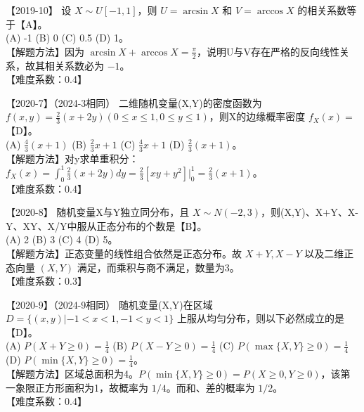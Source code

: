 \documentclass[zihao=4, a4paper, fontset=mac]{ctexart}
\begin{document}
\par\vspace{\baselineskip}

【2019-10】 设 $X\sim U[-1,1]$，则 $U=\arcsin X$ 和 $V=\arccos X$ 的相关系数等于【A】。\\
(A) -1 \quad (B) 0 \quad (C) 0.5 \quad (D) 1。\\
【解题方法】因为 $\arcsin X + \arccos X = \frac{\pi}{2}$，说明U与V存在严格的反向线性关系，故其相关系数必为 $-1$。\\
【难度系数：0.4】

\par\vspace{\baselineskip}

【2020-7】（2024-3相同） 二维随机变量(X,Y)的密度函数为 $f(x,y)=\frac{2}{3}(x+2y) (0\le x\le1,0\le y\le1)$，则X的边缘概率密度 $f_X(x)=$ 【D】。\\
(A) $\frac{4}{3}(x+1)$ \quad (B) $\frac{2}{3}x+1$ \quad (C) $\frac{4}{3}x+1$ \quad (D) $\frac{2}{3}(x+1)$。\\
【解题方法】对y求单重积分：$f_X(x)=\int_0^1 \frac{2}{3}(x+2y)dy = \frac{2}{3}[xy+y^2]|_0^1 = \frac{2}{3}(x+1)$。\\
【难度系数：0.4】

\par\vspace{\baselineskip}

【2020-8】 随机变量X与Y独立同分布，且 $X\sim N(-2,3)$，则(X,Y)、X+Y、X-Y、XY、X/Y中服从正态分布的个数是【B】。\\
(A) 2 \quad (B) 3 \quad (C) 4 \quad (D) 5。\\
【解题方法】正态变量的线性组合依然是正态分布。故 $X+Y, X-Y$ 以及二维正态向量 $(X,Y)$ 满足，而乘积与商不满足，数量为3。\\
【难度系数：0.3】

\par\vspace{\baselineskip}

【2020-9】（2024-9相同） 随机变量(X,Y)在区域 $D=\{(x,y)|-1<x<1,-1<y<1\}$ 上服从均匀分布，则以下必然成立的是【D】。\\
(A) $P(X+Y\ge0)=\frac{1}{4}$ \quad (B) $P(X-Y\ge0)=\frac{1}{4}$ \quad (C) $P(\max\{X,Y\}\ge0)=\frac{1}{4}$ \quad (D) $P(\min\{X,Y\}\ge0)=\frac{1}{4}$。\\
【解题方法】区域总面积为4。$P(\min\{X,Y\}\ge0) = P(X\ge0, Y\ge0)$，该第一象限正方形面积为1，故概率为 $1/4$。而和、差的概率为 $1/2$。\\
【难度系数：0.4】
\end{document}
